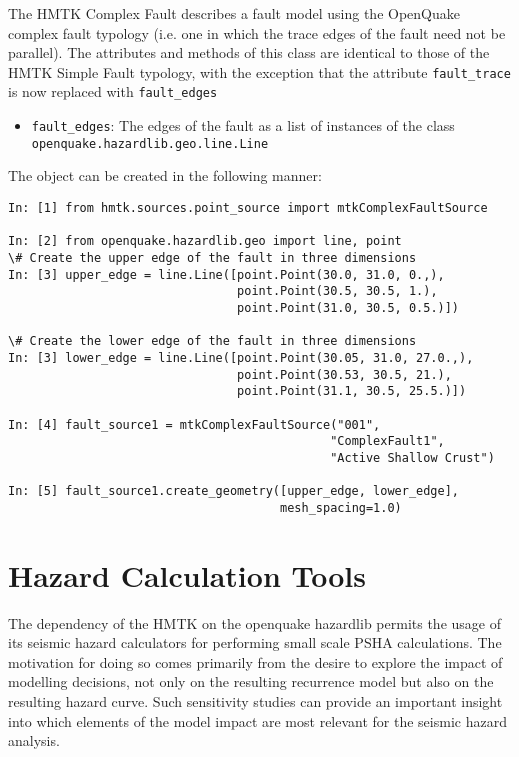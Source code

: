 The HMTK Complex Fault describes a fault model using the OpenQuake complex fault typology (i.e. one in which the trace edges of the fault need not be parallel). The attributes and methods of this class are identical to those of the HMTK Simple Fault typology, with the exception that the attribute \verb=fault_trace= is now replaced with \verb=fault_edges=

\begin{itemize}
\item \verb=fault_edges=: The edges of the fault as a list of instances of the class \\ \verb=openquake.hazardlib.geo.line.Line=
\end{itemize}

The object can be created in the following manner:

\begin{Verbatim}[frame=single, commandchars=\\\{\}, fontsize=\scriptsize, samepage=true]
In: [1] from hmtk.sources.point_source import mtkComplexFaultSource

In: [2] from openquake.hazardlib.geo import line, point
\# Create the upper edge of the fault in three dimensions
In: [3] upper_edge = line.Line([point.Point(30.0, 31.0, 0.,),
                                point.Point(30.5, 30.5, 1.),
                                point.Point(31.0, 30.5, 0.5.)]) 
                                 
\# Create the lower edge of the fault in three dimensions
In: [3] lower_edge = line.Line([point.Point(30.05, 31.0, 27.0.,),
                                point.Point(30.53, 30.5, 21.),
                                point.Point(31.1, 30.5, 25.5.)]) 

In: [4] fault_source1 = mtkComplexFaultSource("001",
                                             "ComplexFault1",
                                             "Active Shallow Crust")

In: [5] fault_source1.create_geometry([upper_edge, lower_edge],
                                      mesh_spacing=1.0)
\end{Verbatim}

\section{Hazard Calculation Tools}

The dependency of the HMTK on the openquake hazardlib permits the usage of its seismic hazard calculators for performing small scale PSHA calculations. The motivation for doing so comes primarily from the desire to explore the impact of modelling decisions, not only on the resulting recurrence model but also on the resulting hazard curve. Such sensitivity studies can provide an important insight into which elements of the model impact are most relevant for the seismic hazard analysis.

